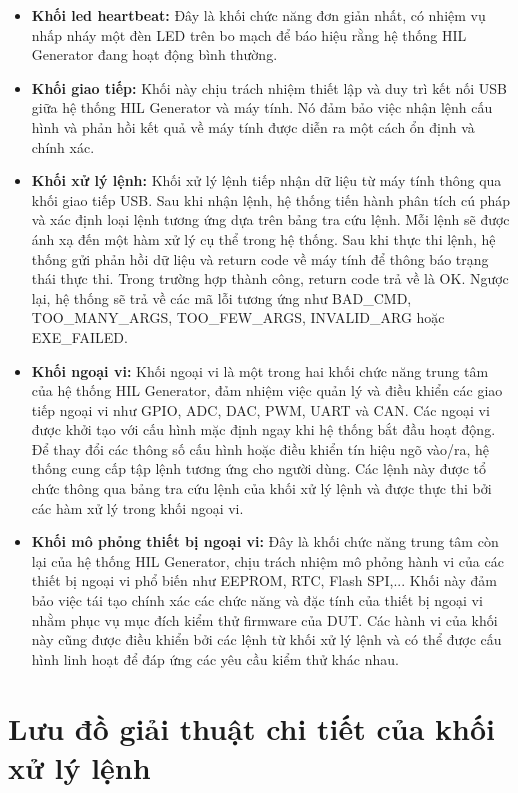 \begin{itemize}
    \item \textbf{Khối led heartbeat:} Đây là khối chức năng đơn giản nhất, có nhiệm vụ nhấp nháy một đèn LED trên bo mạch để báo hiệu rằng hệ thống HIL Generator đang hoạt động bình thường.
    \item \textbf{Khối giao tiếp:} Khối này chịu trách nhiệm thiết lập và duy trì kết nối USB giữa hệ thống HIL Generator và máy tính. Nó đảm bảo việc nhận lệnh cấu hình và phản hồi kết quả về máy tính được diễn ra một cách ổn định và chính xác.
    \item \textbf{Khối xử lý lệnh:} Khối xử lý lệnh tiếp nhận dữ liệu từ máy tính thông qua khối giao tiếp USB. Sau khi nhận lệnh, hệ thống tiến hành phân tích cú pháp và xác định loại lệnh tương ứng dựa trên bảng tra cứu lệnh. Mỗi lệnh sẽ được ánh xạ đến một hàm xử lý cụ thể trong hệ thống. Sau khi thực thi lệnh, hệ thống gửi phản hồi dữ liệu và return code về máy tính để thông báo trạng thái thực thi. Trong trường hợp thành công, return code trả về là OK. Ngược lại, hệ thống sẽ trả về các mã lỗi tương ứng như BAD\_CMD, TOO\_MANY\_ARGS, TOO\_FEW\_ARGS, INVALID\_ARG hoặc EXE\_FAILED.
    \item \textbf{Khối ngoại vi:} Khối ngoại vi là một trong hai khối chức năng trung tâm của hệ thống HIL Generator, đảm nhiệm việc quản lý và điều khiển các giao tiếp ngoại vi như GPIO, ADC, DAC, PWM, UART và CAN. Các ngoại vi được khởi tạo với cấu hình mặc định ngay khi hệ thống bắt đầu hoạt động. Để thay đổi các thông số cấu hình hoặc điều khiển tín hiệu ngõ vào/ra, hệ thống cung cấp tập lệnh tương ứng cho người dùng. Các lệnh này được tổ chức thông qua bảng tra cứu lệnh của khối xử lý lệnh và được thực thi bởi các hàm xử lý trong khối ngoại vi.
    \item \textbf{Khối mô phỏng thiết bị ngoại vi:} Đây là khối chức năng trung tâm còn lại của hệ thống HIL Generator, chịu trách nhiệm mô phỏng hành vi của các thiết bị ngoại vi phổ biến như EEPROM, RTC, Flash SPI,... Khối này đảm bảo việc tái tạo chính xác các chức năng và đặc tính của thiết bị ngoại vi nhằm phục vụ mục đích kiểm thử firmware của DUT. Các hành vi của khối này cũng được điều khiển bởi các lệnh từ khối xử lý lệnh và có thể được cấu hình linh hoạt để đáp ứng các yêu cầu kiểm thử khác nhau.
\end{itemize}

\section{Lưu đồ giải thuật chi tiết của khối xử lý lệnh}

